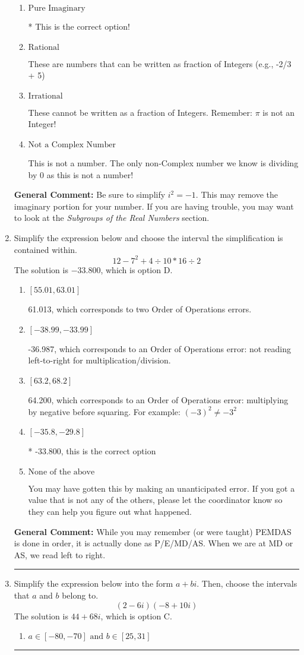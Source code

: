 \documentclass{extbook}[14pt]
\newcommand{\litem}[1]{\item #1

\rule{\textwidth}{0.4pt}}
\begin{document}
\begin{enumerate}
{\begin{enumerate}[label=\Alph*.]
This is a Complex number $(a+bi)$ that is not Real (has $i$ as part of the number).
\item \( \text{Pure Imaginary} \)

* This is the correct option!
\item \( \text{Rational} \)

These are numbers that can be written as fraction of Integers (e.g., -2/3 + 5)
\item \( \text{Irrational} \)

These cannot be written as a fraction of Integers. Remember: $\pi$ is not an Integer!
\item \( \text{Not a Complex Number} \)

This is not a number. The only non-Complex number we know is dividing by 0 as this is not a number!
\end{enumerate}

\textbf{General Comment:} Be sure to simplify $i^2 = -1$. This may remove the imaginary portion for your number. If you are having trouble, you may want to look at the \textit{Subgroups of the Real Numbers} section.
}
\litem{
Simplify the expression below and choose the interval the simplification is contained within.
\[ 12 - 7^2 + 4 \div 10 * 16 \div 2 \]The solution is \( -33.800 \), which is option D.\begin{enumerate}[label=\Alph*.]
\item \( [55.01, 63.01] \)

 61.013, which corresponds to two Order of Operations errors.
\item \( [-38.99, -33.99] \)

 -36.987, which corresponds to an Order of Operations error: not reading left-to-right for multiplication/division.
\item \( [63.2, 68.2] \)

 64.200, which corresponds to an Order of Operations error: multiplying by negative before squaring. For example: $(-3)^2 \neq -3^2$
\item \( [-35.8, -29.8] \)

* -33.800, this is the correct option
\item \( \text{None of the above} \)

 You may have gotten this by making an unanticipated error. If you got a value that is not any of the others, please let the coordinator know so they can help you figure out what happened.
\end{enumerate}

\textbf{General Comment:} While you may remember (or were taught) PEMDAS is done in order, it is actually done as P/E/MD/AS. When we are at MD or AS, we read left to right.
}
\litem{
Simplify the expression below into the form $a+bi$. Then, choose the intervals that $a$ and $b$ belong to.
\[ (2 - 6 i)(-8 + 10 i) \]The solution is \( 44 + 68 i \), which is option C.\begin{enumerate}[label=\Alph*.]
\item \( a \in [-80, -70] \text{ and } b \in [25, 31] \)


\end{enumerate}}
\end{enumerate}
\end{document}
